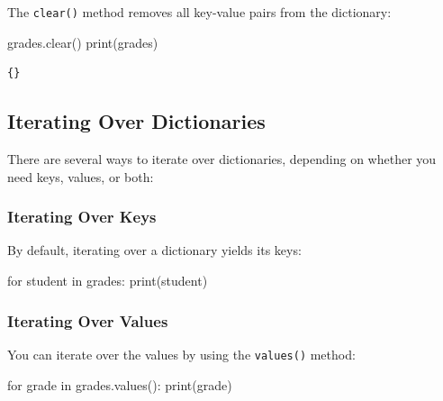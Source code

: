 \documentclass[
  letterpaper,
  DIV=11,
  numbers=noendperiod]{scrreprt}
\newenvironment{Shaded}{\begin{snugshade}}{\end{snugshade}}
\newcommand{\BuiltInTok}[1]{\textcolor[rgb]{0.00,0.23,0.31}{#1}}
\newcommand{\ControlFlowTok}[1]{\textcolor[rgb]{0.00,0.23,0.31}{#1}}
\newcommand{\KeywordTok}[1]{\textcolor[rgb]{0.00,0.23,0.31}{#1}}
\newcommand{\NormalTok}[1]{\textcolor[rgb]{0.00,0.23,0.31}{#1}}
\begin{document}
The \texttt{clear()} method removes all key-value pairs from the
dictionary:

\begin{Shaded}
\begin{Highlighting}[]
\NormalTok{grades.clear()}
\BuiltInTok{print}\NormalTok{(grades) }
\end{Highlighting}
\end{Shaded}

\begin{verbatim}
{}
\end{verbatim}

\hypertarget{iterating-over-dictionaries}{%
\subsection{Iterating Over
Dictionaries}\label{iterating-over-dictionaries}}

There are several ways to iterate over dictionaries, depending on
whether you need keys, values, or both:

\hypertarget{iterating-over-keys}{%
\subsubsection{Iterating Over Keys}\label{iterating-over-keys}}

By default, iterating over a dictionary yields its keys:

\begin{Shaded}
\begin{Highlighting}[]
\ControlFlowTok{for}\NormalTok{ student }\KeywordTok{in}\NormalTok{ grades:}
    \BuiltInTok{print}\NormalTok{(student)}
\end{Highlighting}
\end{Shaded}

\hypertarget{iterating-over-values}{%
\subsubsection{Iterating Over Values}\label{iterating-over-values}}

You can iterate over the values by using the \texttt{values()} method:

\begin{Shaded}
\begin{Highlighting}[]
\ControlFlowTok{for}\NormalTok{ grade }\KeywordTok{in}\NormalTok{ grades.values():}
    \BuiltInTok{print}\NormalTok{(grade)}
\end{Highlighting}
\end{Shaded}
\end{document}
